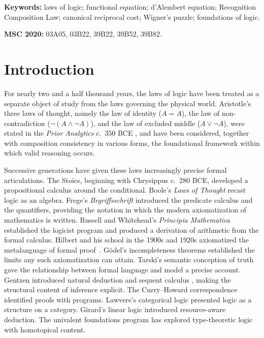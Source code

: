 \documentclass[11pt,a4paper]{article}
\theoremstyle{definition}
\theoremstyle{remark}
\begin{document}
\noindent\textbf{Keywords:} laws of logic; functional equation;
d'Alembert equation; Recognition Composition Law; canonical reciprocal cost;
Wigner's puzzle; foundations of logic.

\medskip

\noindent\textbf{MSC 2020:} 03A05, 03B22, 39B22, 39B52, 39B82.

\section{Introduction}

For nearly two and a half thousand years, the laws of logic have been
treated as a separate object of study from the laws governing the physical
world. Aristotle's three laws of thought, namely the law of identity
($A = A$), the law of non-contradiction ($\neg(A \wedge \neg A)$), and
the law of excluded middle ($A \vee \neg A$), were stated in the
\emph{Prior Analytics} c.~350 BCE \cite{Aristotle}, and have been considered, together
with composition consistency in various forms, the foundational framework
within which valid reasoning occurs.

Successive generations have given these laws increasingly precise formal
articulations. The Stoics, beginning with Chrysippus c.~280 BCE, developed a
propositional calculus around the conditional. Boole's \emph{Laws of
Thought} \cite{Boole1854} recast logic as an algebra. Frege's
\emph{Begriffsschrift} \cite{Frege1879} introduced the predicate calculus
and the quantifiers, providing the notation in which the modern
axiomatization of mathematics is written. Russell and Whitehead's
\emph{Principia Mathematica} \cite{RussellWhitehead1913} established the
logicist program and produced a derivation of arithmetic from the formal
calculus. Hilbert and his school in the 1900s and 1920s axiomatized the
metalanguage of formal proof~\cite{Hilbert1925}. G\"odel's incompleteness
theorems \cite{Goedel1931} established the limits any such axiomatization
can attain. Tarski's semantic conception of truth \cite{Tarski1933} gave the
relationship between formal language and model a precise account. Gentzen
introduced natural deduction and sequent calculus \cite{Gentzen1935},
making the structural content of inference explicit. The Curry--Howard
correspondence \cite{Curry1934, Howard1969} identified proofs with programs.
Lawvere's categorical logic \cite{Lawvere1964} presented logic as a
structure on a category. Girard's linear logic \cite{Girard1987} introduced
resource-aware deduction. The univalent foundations program
\cite{HoTT2013} has explored type-theoretic logic with homotopical content.
\end{document}
